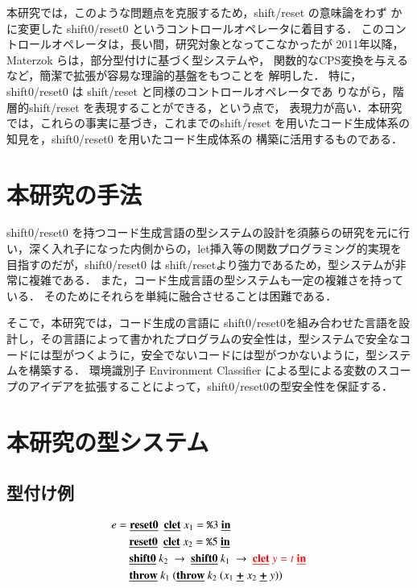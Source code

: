 \documentclass[10pt,a4j,twocolumn]{jarticle}
\newcommand\cResetz{\underline{\textbf{reset0}}}
\newcommand\cShiftz{\underline{\textbf{shift0}}}
\newcommand\cThrow{\underline{\textbf{throw}}}
\newcommand\cPlus{\underline{\textbf{+}}}
\newcommand\cLet{\underline{\textbf{clet}}}
\newcommand\cIn{\underline{\textbf{in}}}
\newcommand\csp[1]{\texttt{\%}{#1}}
\newcommand\red[1]{\textcolor{red}{#1}}
\theoremstyle{definition}
\begin{document}
本研究では，このような問題点を克服するため，shift/reset の意味論をわず
かに変更した shift0/reset0 というコントロールオペレータに着目する．
このコントロールオペレータは，長い間，研究対象となってこなかったが
2011年以降，Materzok らは，部分型付けに基づく型システムや，
関数的なCPS変換を与えるなど，簡潔で拡張が容易な理論的基盤をもつことを
解明した\cite{Materzok2011,materzok2012}．
特に，shift0/reset0 は shift/reset と同様のコントロールオペレータであ
りながら，階層的shift/reset を表現することができる，という点で，
表現力が高い．本研究では，これらの事実に基づき，これまでのshift/reset
を用いたコード生成体系の知見を，shift0/reset0 を用いたコード生成体系の
構築に活用するものである．

\section{本研究の手法}
shift0/reset0 を持つコード生成言語の型システムの設計を須藤らの研究\cite{Sudo2014}を元に行い，深く入れ子になった内側からの，let挿入等の関数プログラミング的実現を目指すのだが，shift0/reset0 は shift/resetより強力であるため，型システムが非常に複雑である．
また，コード生成言語の型システムも一定の複雑さを持っている．
そのためにそれらを単純に融合させることは困難である．

そこで，本研究では，コード生成の言語に shift0/reset0を組み合わせた言語を設計し，その言語によって書かれたプログラムの安全性は，型システムで安全なコードには型がつくように，安全でないコードには型がつかないように，型システムを構築する．
環境識別子 Environment Classifier による型による変数のスコープのアイデア\cite{Sudo2014,Taha:2003:EC:604131.604134}を拡張することによって，shift0/reset0の型安全性を保証する．

\section{本研究の型システム}

\subsection{型付け例}
\begin{align*}
  e & = \cResetz ~~\cLet~x_1=\csp{3}~\cIn \\
    & \phantom{=}~~ \cResetz ~~\cLet~x_2=\csp{5}~\cIn \\
    & \phantom{=}~~ \cShiftz~k_2~\to~ \cShiftz~k_1~\to~ \red{\cLet~y=t~\cIn} \\
    & \phantom{=}~~ \cThrow~k_1~(\cThrow~k_2~(x_1~\cPlus~x_2~\cPlus~y))
\end{align*}
\end{document}
